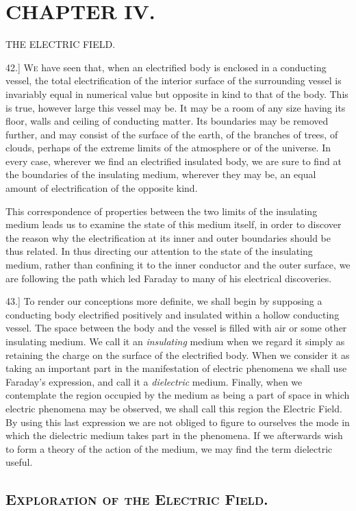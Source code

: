 \documentclass[12pt,oneside]{book}[2021/10/04]
\newcommand{\Heading}{\centering\normalfont}
\newcommand{\Chapter}[1]{\section*{\large\Heading #1}}
\newcommand{\Section}[1]{\subsection*{\normalsize\Heading\scshape #1}}
\newcommand{\Runhead}[1]{\fancyhead[C]{\iffloatpage{}{\small#1}}}
\newcommand{\Subheading}[1]{\begin{center}\small #1 \end{center}}
\newcommand{\article}[1]{\phantomsection \label{art:#1}{#1.]}}
\newcommand{\¬}{\hphantom{0}}
\newcommand{\newchapter}{\newpage\thispagestyle{empty}}
\begin{document}
\newchapter
\Chapter{CHAPTER IV.}

\Subheading{THE ELECTRIC FIELD.}
\Runhead{EXPLORATION OF THE ELECTRIC FIELD.}
\article{42} \textsc{We} have seen that, when an electrified body is enclosed in
a conducting vessel, the total electrification of the interior surface
of the surrounding vessel is invariably equal in numerical value
but opposite in kind to that of the body. This is true, however
large this vessel may be. It may be a room of any size having
its floor, walls and ceiling of conducting matter. Its boundaries
may be removed further, and may consist of the surface of the
earth, of the branches of trees, of clouds, perhaps of the extreme
limits of the atmosphere or of the universe. In every case, wherever
we find an electrified insulated body, we are sure to find at
the boundaries of the insulating medium, wherever they may be,
an equal amount of electrification of the opposite kind.

This correspondence of properties between the two limits of
the insulating medium leads us to examine the state of this
medium itself, in order to discover the reason why the electrification
at its inner and outer boundaries should be thus related. In
thus directing our attention to the state of the insulating medium,
rather than confining it to the inner conductor and the outer surface,
we are following the path which led Faraday to many of his
electrical discoveries.

\article{43} To render our conceptions more definite, we shall begin by
supposing a conducting body electrified positively and insulated
within a hollow conducting vessel. The space between the body
and the vessel is filled with air or some other insulating medium.
We call it an \textit{insulating} medium when we regard it simply as
retaining the charge on the surface of the electrified body. When
we consider it as taking an important part in the manifestation
of electric phenomena we shall use Faraday's expression, and call
it a \textit{dielectric} medium. Finally, when we contemplate the region
occupied by the medium as being a part of space in which electric
phenomena may be observed, we shall call this region the Electric
Field. By using this last expression we are not obliged to figure
to ourselves the mode in which the dielectric medium takes part in
the phenomena. If we afterwards wish to form a theory of the
action of the medium, we may find the term dielectric useful.

\Section{Exploration of the Electric Field.}
\end{document}
